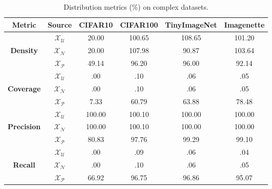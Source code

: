 \begin{table}[ht]
    \caption{Distribution metrics (\%) on complex datasets.}
    \label{tab:abla-embeddings-coverage-objects}
    \centering
    \begin{tabular}{c|c|c|c|c|c}
        \hline  \textbf{Metric} & \textbf{Source} & \textbf{CIFAR10} & \textbf{CIFAR100} & \textbf{TinyImageNet} & \textbf{Imagenette} \\
        \hline
                           & $\mathcal{X}_\mathcal{U}$ & \phantom{0}20.00 &           100.65 &           108.65 &           101.20 \\
        \textbf{Density}   & $\mathcal{X}_\mathcal{N}$ & \phantom{0}20.00 &           107.98 & \phantom{0}90.87 &           103.64 \\
                           & $\mathcal{X}_\mathcal{P}$ & \phantom{0}49.14 & \phantom{0}96.20 & \phantom{0}96.00 & \phantom{0}92.14 \\
        \hline
                           & $\mathcal{X}_\mathcal{U}$ & \phantom{000}.00 & \phantom{000}.10 & \phantom{000}.06 & \phantom{000}.05 \\
        \textbf{Coverage}  & $\mathcal{X}_\mathcal{N}$ & \phantom{000}.00 & \phantom{000}.10 & \phantom{000}.06 & \phantom{000}.05 \\
                           & $\mathcal{X}_\mathcal{P}$ & \phantom{00}7.33 & \phantom{0}60.79 & \phantom{0}63.88 & \phantom{0}78.48 \\
        \hline
                           & $\mathcal{X}_\mathcal{U}$ &           100.00 &           100.10 &           100.00 &           100.00 \\
        \textbf{Precision} & $\mathcal{X}_\mathcal{N}$ &           100.00 &           100.10 &           100.00 &           100.00 \\
                           & $\mathcal{X}_\mathcal{P}$ & \phantom{0}80.83 & \phantom{0}97.76 & \phantom{0}99.29 & \phantom{0}99.10 \\
        \hline
                           & $\mathcal{X}_\mathcal{U}$ & \phantom{000}.00 & \phantom{000}.09 & \phantom{000}.06 & \phantom{000}.04 \\
        \textbf{Recall}    & $\mathcal{X}_\mathcal{N}$ & \phantom{000}.00 & \phantom{000}.10 & \phantom{000}.06 & \phantom{000}.05 \\
                           & $\mathcal{X}_\mathcal{P}$ & \phantom{0}66.92 & \phantom{0}96.75 & \phantom{0}96.86 & \phantom{0}95.07 \\
        \hline
    \end{tabular}
\end{table}

